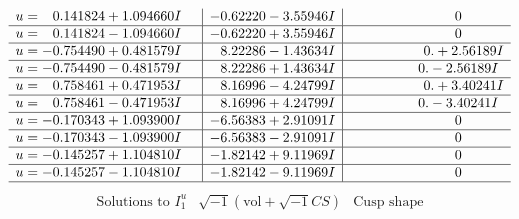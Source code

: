 \documentclass[1p]{elsarticle_modified}
\theoremstyle{definition}
\newcommand{\I}{\sqrt{-1}}
\begin{document}
$$\begin{array}{c|c|c}
\begin{aligned}
u &= \phantom{-}0.141824 + 1.094660 I\end{aligned}
 & -0.62220 - 3.55946 I & \phantom{-0.000000 } 0 \\ \hline\begin{aligned}
u &= \phantom{-}0.141824 - 1.094660 I\end{aligned}
 & -0.62220 + 3.55946 I & \phantom{-0.000000 } 0 \\ \hline\begin{aligned}
u &= -0.754490 + 0.481579 I\end{aligned}
 & \phantom{-}8.22286 - 1.43634 I & \phantom{-0.000000 -}0. + 2.56189 I \\ \hline\begin{aligned}
u &= -0.754490 - 0.481579 I\end{aligned}
 & \phantom{-}8.22286 + 1.43634 I & \phantom{-0.000000 } 0. - 2.56189 I \\ \hline\begin{aligned}
u &= \phantom{-}0.758461 + 0.471953 I\end{aligned}
 & \phantom{-}8.16996 - 4.24799 I & \phantom{-0.000000 -}0. + 3.40241 I \\ \hline\begin{aligned}
u &= \phantom{-}0.758461 - 0.471953 I\end{aligned}
 & \phantom{-}8.16996 + 4.24799 I & \phantom{-0.000000 } 0. - 3.40241 I \\ \hline\begin{aligned}
u &= -0.170343 + 1.093900 I\end{aligned}
 & -6.56383 + 2.91091 I & \phantom{-0.000000 } 0 \\ \hline\begin{aligned}
u &= -0.170343 - 1.093900 I\end{aligned}
 & -6.56383 - 2.91091 I & \phantom{-0.000000 } 0 \\ \hline\begin{aligned}
u &= -0.145257 + 1.104810 I\end{aligned}
 & -1.82142 + 9.11969 I & \phantom{-0.000000 } 0 \\ \hline\begin{aligned}
u &= -0.145257 - 1.104810 I\end{aligned}
 & -1.82142 - 9.11969 I & \phantom{-0.000000 } 0\\
 \hline 
 \end{array}$$\newpage$$\begin{array}{c|c|c}  
\text{Solutions to }I^u_{1}& \I (\text{vol} + \sqrt{-1}CS) & \text{Cusp shape}\\

\end{array}$$
\end{document}
